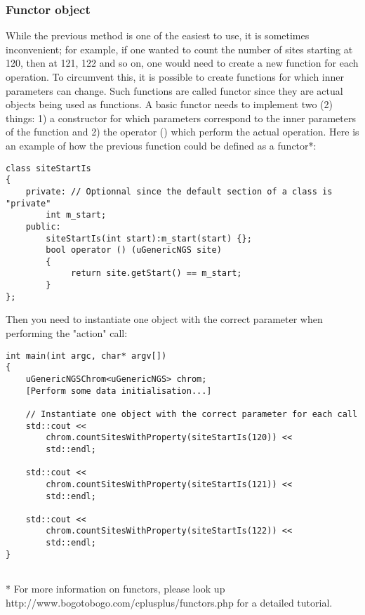 \documentclass[letterpaper,10pt]{article}
\begin{document}
\subsubsection{Functor object}
While the previous method is one of the easiest to use, it is sometimes inconvenient; for example, if one wanted to count the number of sites starting at 120, then at 121, 122 and so on, one would need to create a new function for each operation. To circumvent this, it is possible to create functions for which inner parameters can change. Such functions are called functor since they are actual objects being used as functions. A basic functor needs to implement two (2) things: 1) a constructor for which parameters correspond to the inner parameters of the function and 2) the operator () which perform the actual operation. Here is an example of how the previous function could be defined as a functor*:
\begin{verbatim}
class siteStartIs
{
    private: // Optionnal since the default section of a class is "private"
        int m_start;
    public:
        siteStartIs(int start):m_start(start) {};
        bool operator () (uGenericNGS site) 
        {
             return site.getStart() == m_start;
        }
};
\end{verbatim}

Then you need to instantiate one object with the correct parameter when performing the "action" call:

\begin{verbatim}
int main(int argc, char* argv[])
{
    uGenericNGSChrom<uGenericNGS> chrom;
    [Perform some data initialisation...]

    // Instantiate one object with the correct parameter for each call
    std::cout << 
        chrom.countSitesWithProperty(siteStartIs(120)) << 
        std::endl;

    std::cout << 
        chrom.countSitesWithProperty(siteStartIs(121)) << 
        std::endl;

    std::cout << 
        chrom.countSitesWithProperty(siteStartIs(122)) << 
        std::endl;
}
 
\end{verbatim}

* For more information on functors, please look up http://www.bogotobogo.com/cplusplus/functors.php for a detailed tutorial.
\end{document}
